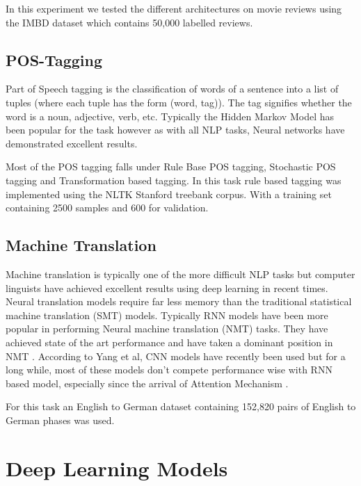 \documentclass[twocolumn,12pt]{asme2ej}
\begin{document}
In this experiment we tested the different architectures on movie reviews using the IMBD dataset which contains 50,000 labelled reviews.

\subsection{POS-Tagging}

Part of Speech tagging is the classification of words of a sentence into a list of tuples (where each tuple has the form (word, tag)). The tag signifies whether the word is a noun, adjective, verb, etc. 
Typically the Hidden Markov Model has been popular for the task however as with all NLP tasks, Neural networks have demonstrated excellent results.

Most of the POS tagging falls under Rule Base POS tagging, Stochastic POS tagging and Transformation based tagging. In this task rule based tagging was implemented using the NLTK Stanford treebank corpus. With a training set containing 2500 samples and 600 for validation. 


\subsection{Machine Translation}

Machine translation is typically one of the more difficult NLP tasks but computer linguists have achieved excellent results using deep learning in recent times. Neural translation models require far less memory than the traditional statistical machine translation (SMT) models. Typically RNN models have been more popular in performing Neural machine translation (NMT) tasks. They have achieved state of the art performance and have taken a dominant position in NMT \cite{SurveyDeepLearningTechniquesforNeuralMachineTranslation}. According to Yang et al, CNN models have recently been used but for a long while, most of these models don’t compete performance wise with RNN based model, especially since the arrival of Attention Mechanism \cite{SurveyDeepLearningTechniquesforNeuralMachineTranslation}.

For this task an English to German dataset containing 152,820 pairs of English to German phases was used.

\section{Deep Learning Models}
\end{document}
